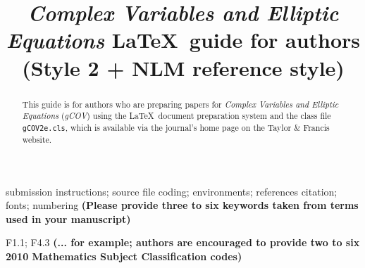 \documentclass{gCOV2e}
\theoremstyle{plain}%
\theoremstyle{definition}
\theoremstyle{remark}
\begin{document}


\title{\textit{Complex Variables and Elliptic Equations} \LaTeX\ guide for authors (Style 2 + NLM reference style)}

\author{
}

\maketitle

\begin{abstract}
This guide is for authors who are preparing papers for \textit{Complex Variables and Elliptic Equations} (\textit{gCOV})
using the \LaTeX\ document preparation system and the class file \texttt{gCOV2e.cls},
which is available via the journal's home page on the Taylor \& Francis website.
\end{abstract}

\begin{keywords}
submission instructions; source file coding; environments; references citation; fonts; numbering
\textbf{(Please provide three to six keywords taken from terms used in your manuscript)}
\end{keywords}

\begin{classcode}F1.1; F4.3 \textbf{(... for example; authors are encouraged to provide two to six 2010 Mathematics Subject Classification codes)}\end{classcode}
\end{document}
